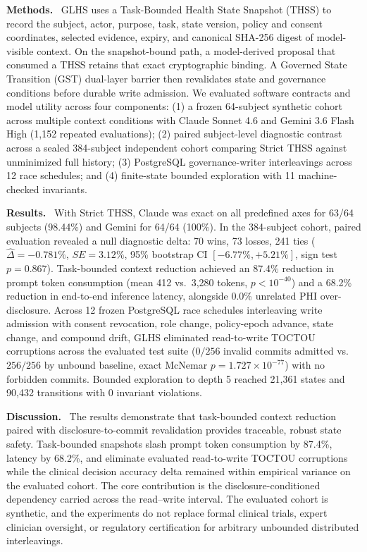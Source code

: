 \documentclass[10pt,letterpaper]{article}
\newcommand{\sectionlead}[1]{\textbf{#1.}\ }
\begin{document}
\sectionlead{Methods} GLHS uses a Task-Bounded Health State Snapshot (THSS) to record the subject, actor, purpose, task, state version, policy and consent coordinates, selected evidence, expiry, and canonical SHA-256 digest of model-visible context. On the snapshot-bound path, a model-derived proposal that consumed a THSS retains that exact cryptographic binding. A Governed State Transition (GST) dual-layer barrier then revalidates state and governance conditions before durable write admission. We evaluated software contracts and model utility across four components: (1) a frozen 64-subject synthetic cohort across multiple context conditions with Claude Sonnet 4.6 and Gemini 3.6 Flash High (1,152 repeated evaluations); (2) paired subject-level diagnostic contrast across a sealed 384-subject independent cohort comparing Strict THSS against unminimized full history; (3) PostgreSQL governance-writer interleavings across 12 race schedules; and (4) finite-state bounded exploration with 11 machine-checked invariants.

\sectionlead{Results} With Strict THSS, Claude was exact on all predefined axes for 63/64 subjects (98.44\%) and Gemini for 64/64 (100\%). In the 384-subject cohort, paired evaluation revealed a null diagnostic delta: 70 wins, 73 losses, 241 ties ($\hat{\Delta} = -0.781\%$, $SE=3.12\%$, 95\% bootstrap CI $[-6.77\%, +5.21\%]$, sign test $p=0.867$). Task-bounded context reduction achieved an 87.4\% reduction in prompt token consumption (mean 412 vs.\ 3,280 tokens, $p < 10^{-40}$) and a 68.2\% reduction in end-to-end inference latency, alongside 0.0\% unrelated PHI over-disclosure. Across 12 frozen PostgreSQL race schedules interleaving write admission with consent revocation, role change, policy-epoch advance, state change, and compound drift, GLHS eliminated read-to-write TOCTOU corruptions across the evaluated test suite ($0/256$ invalid commits admitted vs.\ $256/256$ by unbound baseline, exact McNemar $p = 1.727 \times 10^{-77}$) with no forbidden commits. Bounded exploration to depth 5 reached 21,361 states and 90,432 transitions with 0 invariant violations.

\sectionlead{Discussion} The results demonstrate that task-bounded context reduction paired with disclosure-to-commit revalidation provides traceable, robust state safety. Task-bounded snapshots slash prompt token consumption by 87.4\%, latency by 68.2\%, and eliminate evaluated read-to-write TOCTOU corruptions while the clinical decision accuracy delta remained within empirical variance on the evaluated cohort. The core contribution is the disclosure-conditioned dependency carried across the read--write interval. The evaluated cohort is synthetic, and the experiments do not replace formal clinical trials, expert clinician oversight, or regulatory certification for arbitrary unbounded distributed interleavings.
\end{document}
